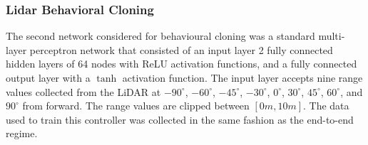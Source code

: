 \documentclass[manuscript,screen,review]{acmart}
\begin{document}
\subsubsection{Lidar Behavioral Cloning}
\label{sec:lidar cloning}
The second network considered for behavioural cloning was a standard multi-layer perceptron network that consisted of an input layer 2 fully connected hidden layers of 64 nodes with ReLU activation functions, and a fully connected output layer with a $\tanh$ activation function. The input layer accepts nine range values collected from the LiDAR at $-90^{\circ}$, $-60^{\circ}$, $-45^{\circ}$, $-30^{\circ}$, $0^{\circ}$, $30^{\circ}$, $45^{\circ}$, $60^{\circ}$, and $90^{\circ}$ from forward. The range values are clipped between $[0m, 10m]$. The data used to train this controller was collected in the same fashion as the end-to-end regime. 




\end{document}
